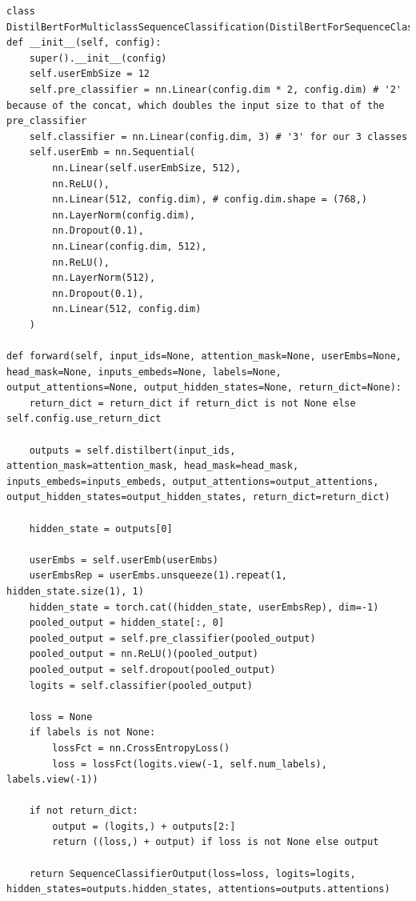 \documentclass{article}
\begin{document}
\begin{lstlisting}
class DistilBertForMulticlassSequenceClassification(DistilBertForSequenceClassification):
def __init__(self, config):
	super().__init__(config)
	self.userEmbSize = 12
	self.pre_classifier = nn.Linear(config.dim * 2, config.dim) # '2' because of the concat, which doubles the input size to that of the pre_classifier
	self.classifier = nn.Linear(config.dim, 3) # '3' for our 3 classes
	self.userEmb = nn.Sequential(
		nn.Linear(self.userEmbSize, 512),
		nn.ReLU(),
		nn.Linear(512, config.dim), # config.dim.shape = (768,)
		nn.LayerNorm(config.dim),
		nn.Dropout(0.1),
		nn.Linear(config.dim, 512),
		nn.ReLU(),
		nn.LayerNorm(512),
		nn.Dropout(0.1),
		nn.Linear(512, config.dim)
	)

def forward(self, input_ids=None, attention_mask=None, userEmbs=None, head_mask=None, inputs_embeds=None, labels=None, output_attentions=None, output_hidden_states=None, return_dict=None):
	return_dict = return_dict if return_dict is not None else self.config.use_return_dict

	outputs = self.distilbert(input_ids, attention_mask=attention_mask, head_mask=head_mask, inputs_embeds=inputs_embeds, output_attentions=output_attentions, output_hidden_states=output_hidden_states, return_dict=return_dict)

	hidden_state = outputs[0]

	userEmbs = self.userEmb(userEmbs)
	userEmbsRep = userEmbs.unsqueeze(1).repeat(1, hidden_state.size(1), 1)
	hidden_state = torch.cat((hidden_state, userEmbsRep), dim=-1)
	pooled_output = hidden_state[:, 0]
	pooled_output = self.pre_classifier(pooled_output)
	pooled_output = nn.ReLU()(pooled_output)
	pooled_output = self.dropout(pooled_output)
	logits = self.classifier(pooled_output)

	loss = None
	if labels is not None:
		lossFct = nn.CrossEntropyLoss()
		loss = lossFct(logits.view(-1, self.num_labels), labels.view(-1))

	if not return_dict:
		output = (logits,) + outputs[2:]
		return ((loss,) + output) if loss is not None else output

	return SequenceClassifierOutput(loss=loss, logits=logits, hidden_states=outputs.hidden_states, attentions=outputs.attentions)
\end{lstlisting}
\end{document}
